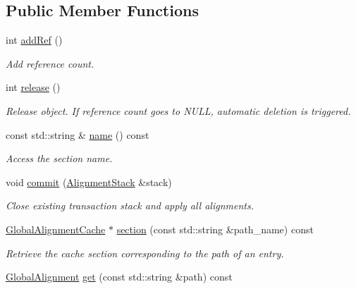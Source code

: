 \subsection*{Public Member Functions}
\begin{DoxyCompactItemize}
\item 
int \hyperlink{class_d_d4hep_1_1_alignments_1_1_global_alignment_cache_a51e8931621f844f3f81517f221b5fe98}{add\+Ref} ()
\begin{DoxyCompactList}\small\item\em Add reference count. \end{DoxyCompactList}\item 
int \hyperlink{class_d_d4hep_1_1_alignments_1_1_global_alignment_cache_a7de701232e1c2da3ca981de290805060}{release} ()
\begin{DoxyCompactList}\small\item\em Release object. If reference count goes to N\+U\+LL, automatic deletion is triggered. \end{DoxyCompactList}\item 
const std\+::string \& \hyperlink{class_d_d4hep_1_1_alignments_1_1_global_alignment_cache_a17cba99abb03d99b933083030ccfa91f}{name} () const
\begin{DoxyCompactList}\small\item\em Access the section name. \end{DoxyCompactList}\item 
void \hyperlink{class_d_d4hep_1_1_alignments_1_1_global_alignment_cache_a883c1f7d0e7687caab250c4de0ed59af}{commit} (\hyperlink{class_d_d4hep_1_1_alignments_1_1_alignment_stack}{Alignment\+Stack} \&stack)
\begin{DoxyCompactList}\small\item\em Close existing transaction stack and apply all alignments. \end{DoxyCompactList}\item 
\hyperlink{class_d_d4hep_1_1_alignments_1_1_global_alignment_cache}{Global\+Alignment\+Cache} $\ast$ \hyperlink{class_d_d4hep_1_1_alignments_1_1_global_alignment_cache_a73e41cb5def2356b5638c46e16645341}{section} (const std\+::string \&path\+\_\+name) const
\begin{DoxyCompactList}\small\item\em Retrieve the cache section corresponding to the path of an entry. \end{DoxyCompactList}\item 
\hyperlink{class_d_d4hep_1_1_alignments_1_1_global_alignment}{Global\+Alignment} \hyperlink{class_d_d4hep_1_1_alignments_1_1_global_alignment_cache_aba2e45794e2829af7bdf5d566a0962f0}{get} (const std\+::string \&path) const

\end{DoxyCompactItemize}
